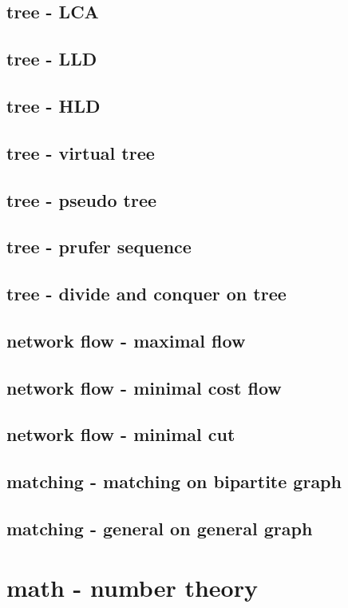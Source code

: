 \documentclass[UTF8, a4paper, titlepage, twoside]{ctexart}
\begin{document}
\subsection{tree - LCA}
\subsection{tree - LLD}
\subsection{tree - HLD}
\subsection{tree - virtual tree}
\subsection{tree - pseudo tree}
\subsection{tree - prufer sequence}
\subsection{tree - divide and conquer on tree}
\subsection{network flow - maximal flow}
\subsection{network flow - minimal cost flow}
\subsection{network flow - minimal cut}
\subsection{matching - matching on bipartite graph}
\subsection{matching - general on general graph}


\section{math - number theory}
\end{document}
